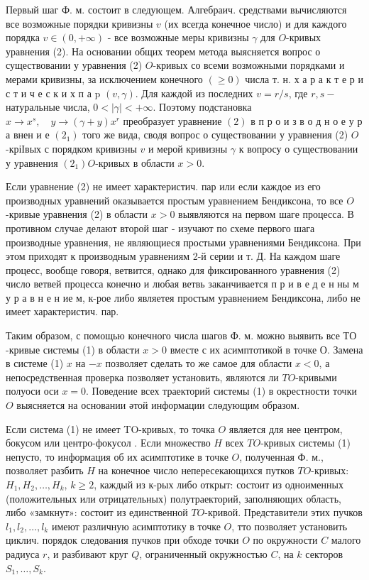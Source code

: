 \documentclass[10pt]{article}
\begin{document}
Первый шаг Ф. м. состоит в следующем. Алгебраич. средствами вычисляются все возможные порядки кривизны $v$ (их всегда конечное число) и для каждого порядка $v \in(0,+\infty)$ - все возможные меры кривизны $\gamma$ для $O$-кривых уравнения (2). На основании общих теорем метода выясняется вопрос о существовании у уравнения (2) $O$-кривых со всеми возможными порядками и мерами кривизны, за исключением конечного $(\geqslant 0)$ числа т. н. х а р а к т е р и с т и ч е с к и х п а p $(v, \gamma)$. Для каждой из последних $v=r / s$, где $r, s-$ натуральные числа, $0<|\gamma|<+\infty$. Поэтому подстановка $x \longrightarrow x^{s}, \quad y \longrightarrow(\gamma+y) x^{r}$ преобразует уравнение $(2)$ в п р о и з в о д н о е у р а внен и е $\left(2_{1}\right)$ того же вида, сводя вопрос о существовании у уравнения (2) $O$-кріІвых с порядком кривизны $v$ и мерой кривизны $\gamma$ к вопросу о существовании у уравнения $\left(2_{1}\right) O$-кривых в области $x>0$.



Если уравнение (2) не имеет характеристич. пар или если каждое из его производных уравнений оказывается простым уравнением Бендиксона, то все $O$-кривые уравнения (2) в области $x>0$ выявляются на первом шаге процесса. В противном случае делают второй шаг - изучают по схеме первого шага производные уравнения, не являющиеся простыми уравнениями Бендиксона. При этом приходят к производным уравнениям 2-й серии и т. Д. На каждом шаге процесс, вообще говоря, ветвится, однако для фиксированного уравнения (2) число ветвей процесса конечно и любая ветвь заканчивается п р и в е д е н ны м у р а в н е н ие м, к-рое либо являетея простым уравнением Бендиксона, либо не имеет характеристич. пар.



Таким образом, с помощью конечного числа шагов Ф. м. можно выявить все $Т О$-кривые системы (1) в области $x>0$ вместе с их асимптотикой в точке $О$. Замена в системе (1) $x$ на $-x$ позволяет сделать то же самое для области $x<0$, а непосредственная проверка позволяет установить, являются ли $T O$-кривыми полуоси оси $x=0$. Поведение всех траекторий системы (1) в окрестности точки $O$ выясняется на основании әтой информации слөдующим образом.



Если система (1) не имеет TO-кривых, то точка $O$ является для нее центром, бокусом или центро-фокусол . Если множество $H$ всех $T O$-кривых системы (1) непусто, то информация об их асимптотике в точке $O$, полученная Ф. м., позволяет разбить $H$ на конечное число непересекающихся путков $T O$-кривых: $H_{1}, H_{2}, \ldots, H_{k}$, $k \geqslant 2$, каждый из к-рых либо открыт: состоит из одноименных (положительных или отрицательных) полутраекторий, заполняющих область, либо «замкнут»: состоит из единственной $T O$-кривой. Представители этих пучков $l_{1}, l_{2}, \ldots, l_{k}$ имеют различную асимптотику в точке $O$, тто позволяет установить циклич. порядок следования пучков при обходе точки $O$ по окружности $C$ малого радиуса $r$, и разбивают круг $Q$, ограниченный окружностью $C$, на $k$ секторов $S_{1}, \ldots, S_{k}$.
\end{document}

